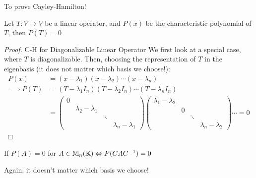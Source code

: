 \begin{goal}
    To prove Cayley-Hamilton!
\end{goal}
\begin{recall}
    Let \(T: V \to V\) be a linear operator, and \(P(x)\) be the characteristic polynomial of \(T\), then \(P(T) = 0\)
\end{recall}

\begin{proof} {C-H for Diagonalizable Linear Operator}
    We first look at a special case, where \(T\) is diagonalizable. Then, choosing the representation of \(T\) in the eigenbasis (it does not matter which basis we choose!):
    \begin{align*}
        P(x)          & = (x - \lambda_1)(x - \lambda_2) \cdots (x - \lambda_n)              \\
        \implies P(T) & = (T - \lambda_1 I_n) (T - \lambda_2 I_n) \cdots (T - \lambda_n I_n) \\
                      & =
        \begin{pmatrix}
            0 &                       &        &                       \\
              & \lambda_2 - \lambda_1 &        &                       \\
              &                       & \ddots &                       \\
              &                       &        & \lambda_n - \lambda_1
        \end{pmatrix}
        \begin{pmatrix}
            \lambda_1 - \lambda_2 &   &        &                       \\
                                  & 0 &        &                       \\
                                  &   & \ddots &                       \\
                                  &   &        & \lambda_n - \lambda_2
        \end{pmatrix}\cdots = 0
    \end{align*}
\end{proof}

\begin{remark}
    If \(P(A) = 0\) for \(A \in \mathbb{M}_n(\mathbb{K}) \Leftrightarrow P(CAC^{-1}) = 0\)

    Again, it doesn't matter which basis we choose!
\end{remark}

